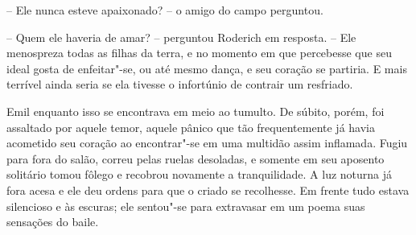 -- Ele nunca esteve apaixonado? -- o amigo do campo perguntou.

-- Quem ele haveria de amar? -- perguntou Roderich em resposta. -- Ele
menospreza todas as filhas da terra, e no momento em que percebesse que
seu ideal gosta de enfeitar"-se, ou até mesmo dança, e seu coração se
partiria. E mais terrível ainda seria se ela tivesse o infortúnio de
contrair um resfriado.

Emil enquanto isso se encontrava em meio ao tumulto. De súbito, porém,
foi assaltado por aquele temor, aquele pânico que tão frequentemente já
havia acometido seu coração ao encontrar"-se em uma multidão assim
inflamada. Fugiu para fora do salão, correu pelas ruelas desoladas, e
somente em seu aposento solitário tomou fôlego e recobrou novamente a
tranquilidade. A luz noturna já fora acesa e ele deu ordens para que o
criado se recolhesse. Em frente tudo estava silencioso e às escuras;
ele sentou"-se para extravasar em um poema suas sensações do baile.
\pagebreak


